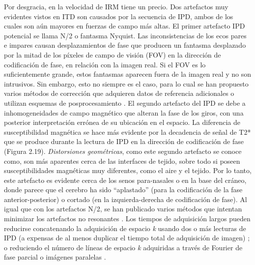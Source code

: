 \documentclass[12pt,a5,twoside]{book}
\begin{document}
Por desgracia, en la velocidad de IRM tiene un precio. Dos artefactos muy evidentes vistos en ITD son causados por la secuencia de IPD, ambos de los cuales son aún mayores en fuerzas de campo más altas. El primer artefacto IPD potencial se llama N/2 o fantasma Nyquist. Las inconsistencias de los ecos pares e impares causan desplazamientos de fase que producen un fantasma desplazado por la mitad de los píxeles de campo de visión (FOV) en la dirección de codificación de fase, en relación con la imagen real. Si el FOV es lo suficientemente grande, estos fantasmas aparecen fuera de la imagen real y no son intrusivos. Sin embargo, esto no siempre es el caso, para lo cual se han propuesto varios métodos de corrección que adquieren datos de referencia adicionales \citep{Hu_1996,kuei_2004} o utilizan esquemas de posprocesamiento \citep{kuei_2004,Zhang_2004}. El segundo artefacto del IPD se debe a inhomogeneidades de campo magnético que alteran la fase de los giros, con una posterior interpretación errónea de su ubicación en el espacio. La diferencia de susceptibilidad magnética se hace más evidente por la decadencia de señal de T2* que se produce durante la lectura de IPD en la dirección de codificación de fase (Figura 2.19). {\it Distorsiones geométricas}, como este segundo artefacto se conoce como, son más aparentes cerca de las interfaces de tejido, sobre todo si poseen susceptibilidades magnéticas muy diferentes, como el aire y el tejido. Por lo tanto, este artefacto es evidente cerca de los senos para-nasales o en la base del cráneo, donde parece que el cerebro ha sido ``aplastado'' (para la codificación de la fase anterior-posterior) o cortado (en la izquierda-derecha de codificación de fase). Al igual que con los artefactos N/2, se han publicado varios métodos que intentan minimizar los artefactos no resonantes \citep{Weiskopf_2005,Jezzard_1995,Reber_1998}. Los tiempos de adquisición largos pueden reducirse concatenando la adquisición de espacio {\it k} usando dos o más lecturas de IPD (a expensas de al menos duplicar el tiempo total de adquisición de imagen) \citep{99,100}; o reduciendo el número de líneas de espacio {\it k} adquiridas a través de Fourier de fase parcial o imágenes paralelas \citep{Pruessmann_1999}.
\end{document}
